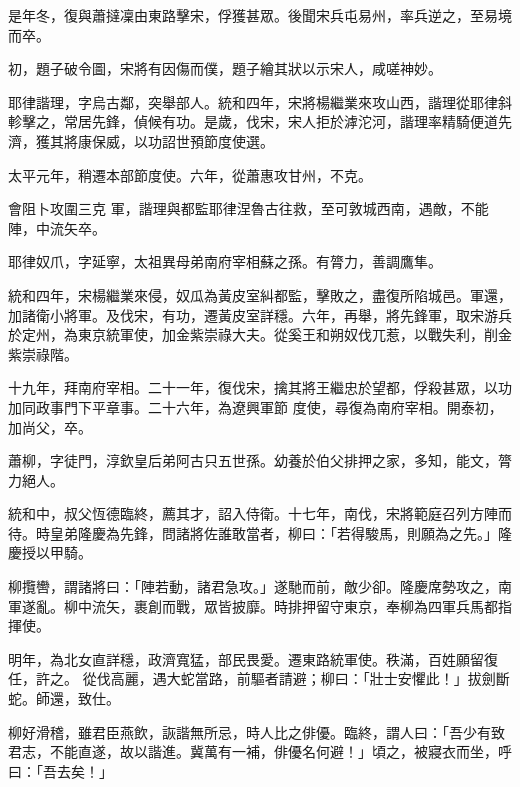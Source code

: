 \begin{pinyinscope}
 是年冬，復與蕭撻凜由東路擊宋，俘獲甚眾。後聞宋兵屯易州，率兵逆之，至易境而卒。



 初，題子破令圖，宋將有因傷而僕，題子繪其狀以示宋人，咸嗟神妙。



 耶律諧理，字烏古鄰，突舉部人。統和四年，宋將楊繼業來攻山西，諧理從耶律斜軫擊之，常居先鋒，偵候有功。是歲，伐宋，宋人拒於滹沱河，諧理率精騎便道先濟，獲其將康保威，以功詔世預節度使選。



 太平元年，稍遷本部節度使。六年，從蕭惠攻甘州，不克。



 會阻卜攻圍三克
 軍，諧理與都監耶律涅魯古往救，至可敦城西南，遇敵，不能陣，中流矢卒。



 耶律奴爪，字延寧，太祖異母弟南府宰相蘇之孫。有膂力，善調鷹隼。



 統和四年，宋楊繼業來侵，奴瓜為黃皮室糾都監，擊敗之，盡復所陷城邑。軍還，加諸衛小將軍。及伐宋，有功，遷黃皮室詳穩。六年，再舉，將先鋒軍，取宋游兵於定州，為東京統軍使，加金紫崇祿大夫。從奚王和朔奴伐兀惹，以戰失利，削金紫崇祿階。



 十九年，拜南府宰相。二十一年，復伐宋，擒其將王繼忠於望都，俘殺甚眾，以功加同政事門下平章事。二十六年，為遼興軍節
 度使，尋復為南府宰相。開泰初，加尚父，卒。



 蕭柳，字徒門，淳欽皇后弟阿古只五世孫。幼養於伯父排押之家，多知，能文，膂力絕人。



 統和中，叔父恆德臨終，薦其才，詔入侍衛。十七年，南伐，宋將範庭召列方陣而待。時皇弟隆慶為先鋒，問諸將佐誰敢當者，柳曰：「若得駿馬，則願為之先。」隆慶授以甲騎。



 柳攬轡，謂諸將曰：「陣若動，諸君急攻。」遂馳而前，敵少卻。隆慶席勢攻之，南軍遂亂。柳中流矢，裹創而戰，眾皆披靡。時排押留守東京，奉柳為四軍兵馬都指揮使。



 明年，為北女直詳穩，政濟寬猛，部民畏愛。遷東路統軍使。秩滿，百姓願留復任，許之。
 從伐高麗，遇大蛇當路，前驅者請避；柳曰：「壯士安懼此！」拔劍斷蛇。師還，致仕。



 柳好滑稽，雖君臣燕飲，詼諧無所忌，時人比之俳優。臨終，謂人曰：「吾少有致君志，不能直遂，故以諧進。冀萬有一補，俳優名何避！」頃之，被寢衣而坐，呼曰：「吾去矣！」




\end{pinyinscope}
